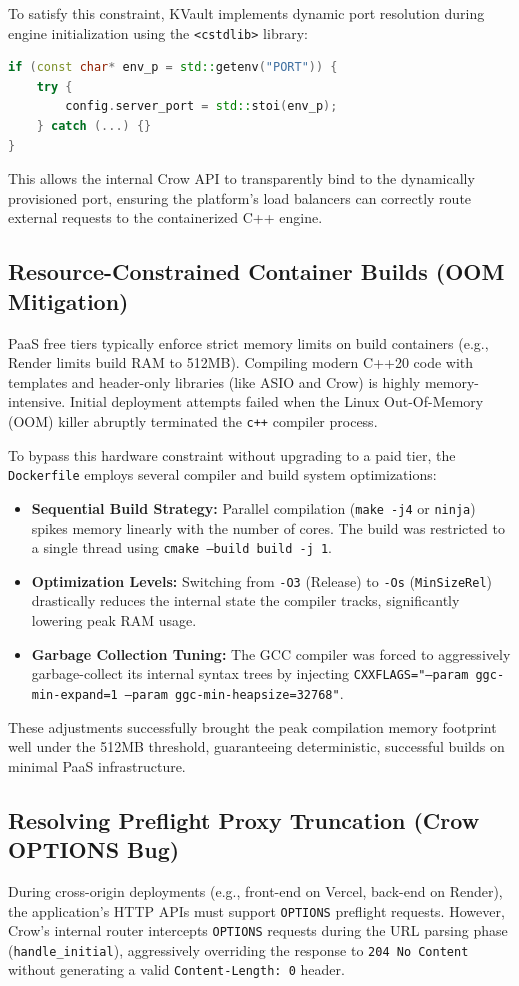 \documentclass[11pt,a4paper]{article}
\begin{document}
To satisfy this constraint, KVault implements dynamic port resolution during engine initialization using the \texttt{<cstdlib>} library:
\begin{lstlisting}[language=C++]
if (const char* env_p = std::getenv("PORT")) {
    try {
        config.server_port = std::stoi(env_p);
    } catch (...) {}
}
\end{lstlisting}
This allows the internal Crow API to transparently bind to the dynamically provisioned port, ensuring the platform's load balancers can correctly route external requests to the containerized C++ engine.

\subsection{Resource-Constrained Container Builds (OOM Mitigation)}
PaaS free tiers typically enforce strict memory limits on build containers (e.g., Render limits build RAM to 512MB). Compiling modern C++20 code with templates and header-only libraries (like ASIO and Crow) is highly memory-intensive. Initial deployment attempts failed when the Linux Out-Of-Memory (OOM) killer abruptly terminated the \texttt{c++} compiler process.

To bypass this hardware constraint without upgrading to a paid tier, the \texttt{Dockerfile} employs several compiler and build system optimizations:
\begin{itemize}[noitemsep]
    \item \textbf{Sequential Build Strategy:} Parallel compilation (\texttt{make -j4} or \texttt{ninja}) spikes memory linearly with the number of cores. The build was restricted to a single thread using \texttt{cmake --build build -j 1}.
    \item \textbf{Optimization Levels:} Switching from \texttt{-O3} (Release) to \texttt{-Os} (\texttt{MinSizeRel}) drastically reduces the internal state the compiler tracks, significantly lowering peak RAM usage.
    \item \textbf{Garbage Collection Tuning:} The GCC compiler was forced to aggressively garbage-collect its internal syntax trees by injecting \texttt{CXXFLAGS="--param ggc-min-expand=1 --param ggc-min-heapsize=32768"}.
\end{itemize}
These adjustments successfully brought the peak compilation memory footprint well under the 512MB threshold, guaranteeing deterministic, successful builds on minimal PaaS infrastructure.

\subsection{Resolving Preflight Proxy Truncation (Crow OPTIONS Bug)}
During cross-origin deployments (e.g., front-end on Vercel, back-end on Render), the application's HTTP APIs must support \texttt{OPTIONS} preflight requests. However, Crow's internal router intercepts \texttt{OPTIONS} requests during the URL parsing phase (\texttt{handle\_initial}), aggressively overriding the response to \texttt{204 No Content} without generating a valid \texttt{Content-Length: 0} header. 
\end{document}

